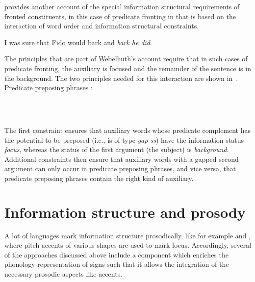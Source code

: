 \documentclass[output=paper
 	        ,biblatex
                ,babelshorthands
                ,newtxmath
                ,draftmode
                ,colorlinks, citecolor=brown
]{langscibook}
\begin{document}
\cite{Webelhuth2007a-u} provides another account of the special
information structural requirements of fronted constituents, in this
case of predicate fronting in  that is based on the interaction
of word order and information structural constraints.
\begin{exe}
  \ex I was sure that Fido would bark and \textit{bark he did}.
\end{exe}

The principles that are part of Webelhuth's account require that in such cases
of predicate fronting, the auxiliary is focused and the remainder of
the sentence is in the background. The two
principles needed for this interaction are shown in~.
\ea
Predicate preposing phrases \citep{Webelhuth2007a-u}:\\
\impl\ 

\bigskip
{}
\impl\ 
  

  \label{fig:predicatepreposing}
\z
The first constraint ensures that auxiliary words whose predicate
complement has the potential to be preposed (i.e., is of type \textit{gap-ss}) have the
information status \textit{focus}, whereas the status of the first
argument (the subject) is \textit{background}. Additional constraints
then ensure that auxiliary words with a gapped second argument can
only occur in predicate preposing phrases, and vice versa, that
predicate preposing phrases contain the right kind of auxiliary.

\section{Information structure and prosody}
\label{sec:prosody}
A lot of languages mark information structure  prosodically, like for
example  and , where pitch accents of various shapes are
used to mark focus. Accordingly, several of the approaches discussed above
include a component which enriches the phonology representation
of signs such that it allows the integration of the necessary prosodic
aspects like accents.
\end{document}
